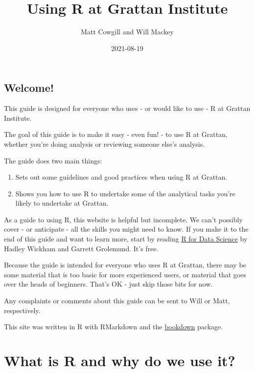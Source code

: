 \documentclass[
]{book}
\title{Using R at Grattan Institute}
\author{Matt Cowgill and Will Mackey}
\date{2021-08-19}
\providecommand{\tightlist}{%
  \setlength{\itemsep}{0pt}\setlength{\parskip}{0pt}}
\begin{document}
\maketitle

{
\setcounter{tocdepth}{1}
\tableofcontents
}
\hypertarget{welcome}{%
\chapter*{Welcome!}\label{welcome}}

This guide is designed for everyone who uses - or would like to use - R at Grattan Institute.

The goal of this guide is to make it easy - even fun! - to use R at Grattan, whether you're doing analysis or reviewing someone else's analysis.

The guide does two main things:

\begin{enumerate}
\def\labelenumi{\arabic{enumi}.}
\tightlist
\item
  Sets out some guidelines and good practices when using R at Grattan.
\item
  Shows you how to use R to undertake some of the analytical tasks you're likely to undertake at Grattan.
\end{enumerate}

As a guide to using R, this website is helpful but incomplete. We can't possibly cover - or anticipate - all the skills you might need to know. If you make it to the end of this guide and want to learn more, start by reading \href{https://r4ds.had.co.nz}{R for Data Science} by Hadley Wickham and Garrett Grolemund. It's free.

Because the guide is intended for everyone who uses R at Grattan, there may be some material that is too basic for more experienced users, or material that goes over the heads of beginners. That's OK - just skip those bits for now.

Any complaints or comments about this guide can be sent to Will or Matt, respectively.

This site was written in R with RMarkdown and the \href{https://bookdown.org}{bookdown} package.

\hypertarget{part-what-is-r-and-why-do-we-use-it}{%
\part{What is R and why do we use it?}\label{part-what-is-r-and-why-do-we-use-it}}
\end{document}
